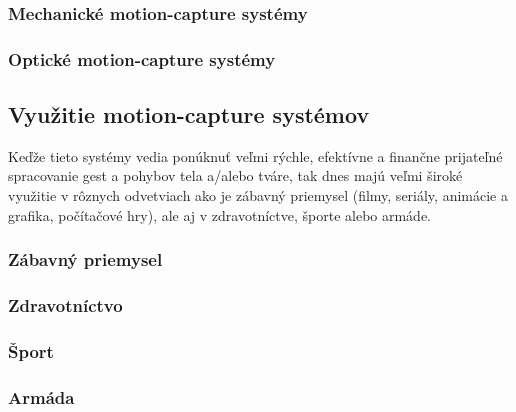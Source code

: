 \subsubsection{Mechanické motion-capture systémy}

\subsubsection{Optické motion-capture systémy}

\cite{mocapFundamentals}

\subsection{Využitie motion-capture systémov}

Keďže tieto systémy vedia ponúknuť veľmi rýchle, efektívne a finančne prijateľné spracovanie gest a pohybov tela a/alebo tváre, tak dnes majú veľmi široké využitie v rôznych odvetviach ako je zábavný priemysel (filmy, seriály, animácie a grafika, počítačové hry), ale aj v zdravotníctve, športe alebo armáde.

\subsubsection{Zábavný priemysel}

\subsubsection{Zdravotníctvo}

\subsubsection{Šport}

\subsubsection{Armáda}

